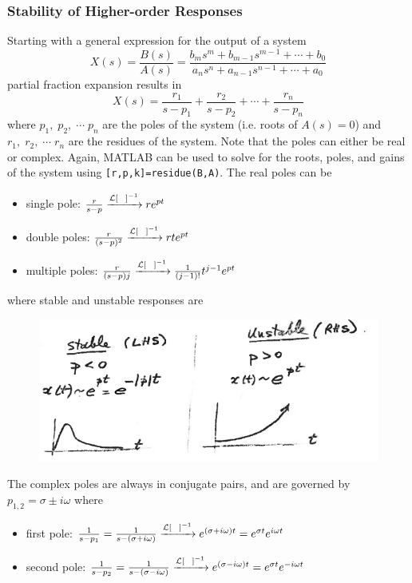 \documentclass[12pt,letter]{article}
\begin{document}
%


\subsubsection{Stability of Higher-order Responses}

Starting with a general expression for the output of a system
\begin{equation}
X(s) = \frac{B(s)}{A(s)} = \frac{b_ms^m+b_{m-1}s^{m-1} + \cdots + b_0}{a_ns^n+a_{n-1}s^{n-1} + \cdots + a_0}
\end{equation}
partial fraction expansion results in
\begin{equation}
X(s) = \frac{r_1}{s-p_1} + \frac{r_2}{s-p_2} + \cdots + \frac{r_n}{s-p_n}
\end{equation}
where $p_1, \; p_2, \; \cdots \; p_n$ are the poles of the system (i.e. roots of $A(s)=0$) and $r_1,\; r_2,\; \cdots \; r_n$ are the residues of the system. Note that the poles can either be real or complex. Again, MATLAB can be used to solve for the roots, poles, and gains of the system using \texttt{[r,p,k]=residue(B,A)}. The real poles can be
\begin{itemize}
	\item single pole: $\frac{r}{s-p} \xrightarrow{\mathcal{L}{\left[\; \; \;\right]}^{-1}} re^{pt}$
	\item double poles: $\frac{r}{(s-p)^2} \xrightarrow{\mathcal{L}{\left[\; \; \;\right]}^{-1}} rte^{pt}$
	\item multiple poles: $\frac{r}{(s-p)j} \xrightarrow{\mathcal{L}{\left[\; \; \;\right]}^{-1}} \frac{1}{(j-1)!}t^{j-1}e^{pt}$
\end{itemize} 
where stable and unstable responses are
\begin{figure}[H]
	\centering
	\includegraphics[width=4.5in]{../figures/stability_higher_order_systems_real_poles}
\end{figure}
The complex poles are always in conjugate pairs, and are governed by $p_{1,2}=\sigma \pm i \omega$ where
\begin{itemize}
	\item first pole: $\frac{1}{s-p_1} = \frac{1}{s-(\sigma + i \omega)} \xrightarrow{\mathcal{L}{\left[\; \; \;\right]}^{-1}} e^{(\sigma + i \omega)t} = e^{\sigma t} e^{i \omega t}$
	\item second pole: $\frac{1}{s-p_2} = \frac{1}{s-(\sigma - i \omega)} \xrightarrow{\mathcal{L}{\left[\; \; \;\right]}^{-1}} e^{(\sigma - i \omega)t} = e^{\sigma t} e^{-i \omega t}$
\end{itemize} 
\end{document}

